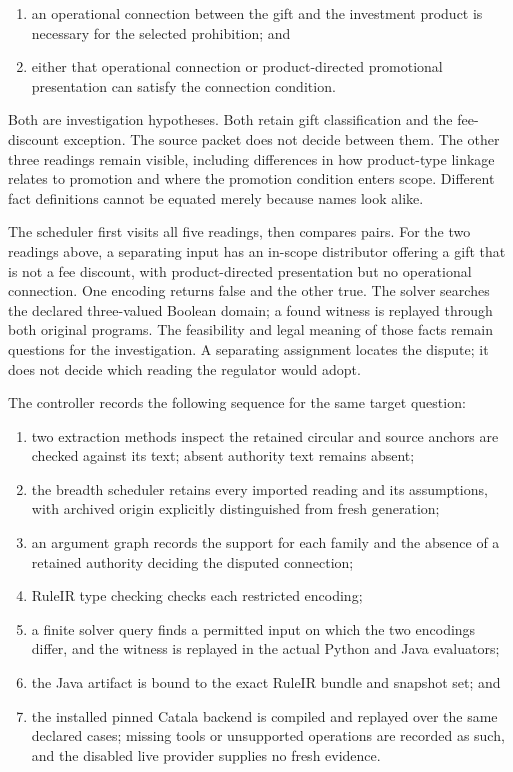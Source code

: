 \begin{enumerate}
\item an operational connection between the gift and the investment product
      is necessary for the selected prohibition; and
\item either that operational connection or product-directed promotional
      presentation can satisfy the connection condition.
\end{enumerate}

Both are investigation hypotheses. Both retain gift classification and the
fee-discount exception. The source packet does not decide between them. The
other three readings remain visible, including differences in how product-type
linkage relates to promotion and where the promotion condition enters scope.
Different fact definitions cannot be equated merely because names look alike.

The scheduler first visits all five readings, then compares pairs. For the two
readings above, a separating input has an in-scope distributor offering a gift
that is not a fee discount, with product-directed presentation but no operational
connection. One encoding returns false and the other true. The solver searches
the declared three-valued Boolean domain; a found witness is replayed through
both original programs. The feasibility and legal meaning of those facts remain
questions for the investigation. A separating assignment locates the dispute;
it does not decide which reading the regulator would adopt.

The controller records the following sequence for the same target question:

\begin{enumerate}
\item two extraction methods inspect the retained circular and source anchors
      are checked against its text; absent authority text remains absent;
\item the breadth scheduler retains every imported reading and its assumptions,
      with archived origin explicitly distinguished from fresh generation;
\item an argument graph records the support for each family and the absence of
      a retained authority deciding the disputed connection;
\item RuleIR type checking checks each restricted encoding;
\item a finite solver query finds a permitted input on which the two encodings
      differ, and the witness is replayed in the actual Python and Java
      evaluators;
\item the Java artifact is bound to the exact RuleIR bundle and snapshot set;
      and
\item the installed pinned Catala backend is compiled and replayed over the
      same declared cases; missing tools or unsupported operations are recorded
      as such, and the disabled live provider supplies no fresh evidence.
\end{enumerate}

